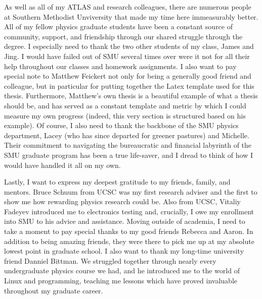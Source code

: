 As well as all of my ATLAS and research colleagues,
    there are numerous people at Southern Methodist Unviversity that made my time here immeasurably better.
All of my fellow physics graduate students have been a constant source of community, support, and friendship
    through our shared struggle through the degree.
I especially need to thank the two other students of my class, James and Jing.
I would have failed out of SMU several times over were it not
    for all their help throughout our classes and homework assignments.
I also want to pay special note to Matthew Feickert not only for being a generally good friend and colleague,
    but in particular for putting together the Latex template\cite{dedman_latex_git} used for this thesis.
Furthermore, Matthew's own thesis\cite{matthew_feickert} is a beautiful example of what a thesis should be,
    and has served as a constant template and metric by which I could measure my own progress
    (indeed, this very section is structured based on his example).
Of course, I also need to thank the backbone of the SMU physics department, 
    Lacey (who has since departed for greener pastures) and Michelle.
Their commitment to navigating the bureaucratic and financial labyrinth of the SMU graduate program
    has been a true life-saver, and I dread to think of how I would have handled it all on my own.


Lastly, I want to express my deepest gratitude to my friends, family, and mentors.
Bruce Schuum from UCSC was my first research adviser
    and the first to show me how rewarding physics research could be.
Also from UCSC, Vitaliy Fadeyev introduced me to electronics testing
    and, crucially, I owe my enrollment into SMU to his advice and assistance.
Moving outside of academia, I need to take a moment to pay special thanks
    to my good friends Rebecca and Aaron.
In addition to being amazing friends, they were there to pick me up
    at my absolute lowest point in graduate school.
I also want to thank my long-time university friend Danniel Bittman.
We struggled together through nearly every undergraduate physics course we had,
    and he introduced me to the world of Linux and programming,
    teaching me lessons which have proved invaluable throughout my graduate career.


